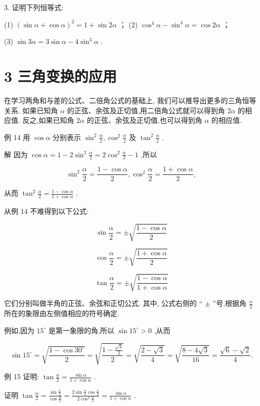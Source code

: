 \documentclass[10pt]{article}
\begin{document}
3. 证明下列恒等式:

(1) \({\left( \sin \alpha  + \cos \alpha \right) }^{2} = 1 + \sin {2\alpha }\) ； (2) \({\cos }^{4}\alpha  - {\sin }^{4}\alpha  = \cos {2\alpha }\) ；

(3) \(\sin {3\alpha } = 3\sin \alpha  - 4{\sin }^{3}\alpha\) .

\section*{3 三角变换的应用}

在学习两角和与差的公式、二倍角公式的基础上, 我们可以推导出更多的三角恒等关系. 如果已知角 \(\alpha\) 的正弦、余弦及正切值,用二倍角公式就可以得到角 \({2\alpha }\) 的相应值. 反之,如果已知角 \({2\alpha }\) 的正弦、余弦及正切值,也可以得到角 \(\alpha\) 的相应值.

例 14 用 \(\cos \alpha\) 分别表示 \({\sin }^{2}\frac{\alpha }{2},{\cos }^{2}\frac{\alpha }{2}\) 及 \({\tan }^{2}\frac{\alpha }{2}\) .

解 因为 \(\cos \alpha  = 1 - 2{\sin }^{2}\frac{\alpha }{2} = 2{\cos }^{2}\frac{\alpha }{2} - 1\) ,所以

\[
{\sin }^{2}\frac{\alpha }{2} = \frac{1 - \cos \alpha }{2},{\cos }^{2}\frac{\alpha }{2} = \frac{1 + \cos \alpha }{2},
\]

从而 \({\tan }^{2}\frac{\alpha }{2} = \frac{1 - \cos \alpha }{1 + \cos \alpha }\) .

从例 14 不难得到以下公式:

\[
\sin \frac{\alpha }{2} =  \pm  \sqrt{\frac{1 - \cos \alpha }{2}}
\]

\[
\cos \frac{\alpha }{2} =  \pm  \sqrt{\frac{1 + \cos \alpha }{2}}
\]

\[
\tan \frac{\alpha }{2} =  \pm  \sqrt{\frac{1 - \cos \alpha }{1 + \cos \alpha }}
\]

它们分别叫做半角的正弦、余弦和正切公式. 其中, 公式右侧的 “ \(\pm\) ”号,根据角 \(\frac{\alpha }{2}\) 所在的象限由左侧值相应的符号确定.

例如,因为 \({15}^{ \circ  }\) 是第一象限的角,所以 \(\sin {15}^{ \circ  } > 0\) ,从而

\[
\sin {15}^{ \circ  } = \sqrt{\frac{1 - \cos {30}^{ \circ  }}{2}} = \sqrt{\frac{1 - \frac{\sqrt{3}}{2}}{2}} = \sqrt{\frac{2 - \sqrt{3}}{4}} = \sqrt{\frac{8 - 4\sqrt{3}}{16}} = \frac{\sqrt{6} - \sqrt{2}}{4}.
\]

例 15 证明: \(\tan \frac{\alpha }{2} = \frac{\sin \alpha }{1 + \cos \alpha }\) .

证明 \(\tan \frac{\alpha }{2} = \frac{\sin \frac{\alpha }{2}}{\cos \frac{\alpha }{2}} = \frac{2\sin \frac{\alpha }{2}\cos \frac{\alpha }{2}}{2{\cos }^{2}\frac{\alpha }{2}} = \frac{\sin \alpha }{1 + \cos \alpha }\) .
\end{document}
